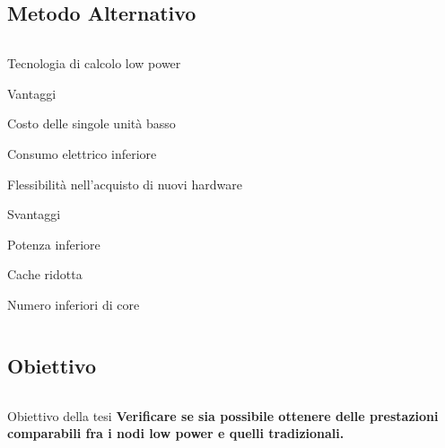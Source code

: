 \documentclass{beamer}
\begin{document}
\subsection{Metodo Alternativo}
\begin{frame}
\begin{columns}
\begin{column}{0.8\linewidth}		
\begin{block}{Tecnologia di calcolo low power}
\begin{itemize}
\begin{block}{Vantaggi}
\small
\item Costo delle singole unità basso
\item Consumo elettrico inferiore
\item Flessibilità nell'acquisto di nuovi hardware
\end{block}
\begin{block}{Svantaggi}
\small
\item Potenza inferiore
\item Cache ridotta
\item Numero inferiori di core
\end{block}
\end{itemize}
\end{block}
\end{column}
\end{columns}
\end{frame}

\subsection{Obiettivo}
\begin{frame}
\begin{columns}
\begin{column}{0.8\linewidth}		
\begin{block}{Obiettivo della tesi}
\small
\textbf{Verificare se sia possibile ottenere delle prestazioni comparabili fra i nodi low power e quelli tradizionali.}
\end{block}
\end{column}
\end{columns}
\end{frame}
\end{document}

